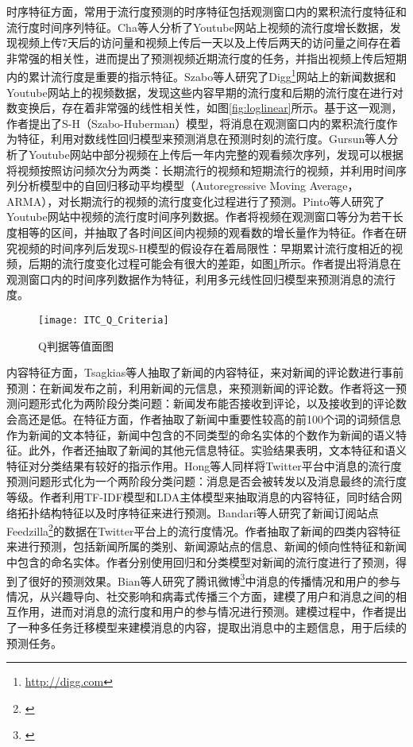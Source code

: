 时序特征方面，常用于流行度预测的时序特征包括观测窗口内的累积流行度特征和流行度时间序列特征。Cha等人\citep{chen2005zhulu}分析了Youtube网站上视频的流行度增长数据，发现视频上传7天后的访问量和视频上传后一天以及上传后两天的访问量之间存在着非常强的相关性，进而提出了预测视频近期流行度的任务，并指出视频上传后短期内的累计流行度是重要的指示特征。Szabo等人\citep{chen2005zhulu}研究了Digg\footnote{\url{http://digg.com}}网站上的新闻数据和Youtube网站上的视频数据，发现这些内容早期的流行度和后期的流行度在进行对数变换后，存在着非常强的线性相关性，如图\ref{fig:loglinear}所示。基于这一观测，作者提出了S-H（Szabo-Huberman）模型，将消息在观测窗口内的累积流行度作为特征，利用对数线性回归模型来预测消息在预测时刻的流行度。Gursun等人\citep{chen2005zhulu}分析了Youtube网站中部分视频在上传后一年内完整的观看频次序列，发现可以根据将视频按照访问频次分为两类：长期流行的视频和短期流行的视频，并利用时间序列分析模型中的自回归移动平均模型（Autoregressive Moving Average，ARMA）\citep{chen2005zhulu}，对长期流行的视频的流行度变化过程进行了预测。Pinto等人\citep{chen2005zhulu}研究了Youtube网站中视频的流行度时间序列数据。作者将视频在观测窗口等分为若干长度相等的区间，并抽取了各时间区间内视频的观看数的增长量作为特征。作者在研究视频的时间序列后发现S-H模型的假设存在着局限性：早期累计流行度相近的视频，后期的流行度变化过程可能会有很大的差距，如图\ref{fig:pinto}所示。作者提出将消息在观测窗口内的时间序列数据作为特征，利用多元线性回归模型来预测消息的流行度。
\begin{figure}[!htbp]
  \centering
  \texttt{[image: ITC\_Q\_Criteria]}
  \caption{Q判据等值面图}
  \label{fig:pinto}
\end{figure}

内容特征方面，Tsagkias等人\citep{chen2005zhulu}抽取了新闻的内容特征，来对新闻的评论数进行事前预测：在新闻发布之前，利用新闻的元信息，来预测新闻的评论数。作者将这一预测问题形式化为两阶段分类问题：新闻发布能否接收到评论，以及接收到的评论数会高还是低。在特征方面，作者抽取了新闻中重要性较高的前100个词的词频信息作为新闻的文本特征，新闻中包含的不同类型的命名实体的个数作为新闻的语义特征。此外，作者还抽取了新闻的其他元信息特征。实验结果表明，文本特征和语义特征对分类结果有较好的指示作用。Hong等人\citep{chen2005zhulu}同样将Twitter平台中消息的流行度预测问题形式化为一个两阶段分类问题：消息是否会被转发以及消息最终的流行度等级。作者利用TF-IDF模型和LDA主体模型\citep{chen2005zhulu}来抽取消息的内容特征，同时结合网络拓扑结构特征以及时序特征来进行预测。Bandari等人\citep{chen2005zhulu}研究了新闻订阅站点Feedzilla\footnote{\url{}}的数据在Twitter平台上的流行度情况。作者抽取了新闻的四类内容特征来进行预测，包括新闻所属的类别、新闻源站点的信息、新闻的倾向性特征和新闻中包含的命名实体。作者分别使用回归和分类模型对新闻的流行度进行了预测，得到了很好的预测效果。Bian等人\citep{chen2005zhulu}研究了腾讯微博\footnote{\url{}}中消息的传播情况和用户的参与情况，从兴趣导向、社交影响和病毒式传播三个方面，建模了用户和消息之间的相互作用，进而对消息的流行度和用户的参与情况进行预测。建模过程中，作者提出了一种多任务迁移模型来建模消息的内容，提取出消息中的主题信息，用于后续的预测任务。

